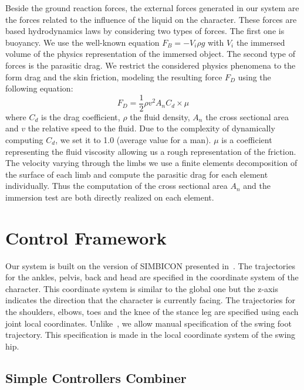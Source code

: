 \documentclass[conference]{acmsiggraph}
\begin{document}
Beside the ground reaction forces, the external forces generated in our system are the forces related to the influence of the liquid on the character. These forces are based hydrodynamics laws by considering two types of forces. The first one is buoyancy. We use the well-known equation $F_{B}=-V_i \rho g$ with $V_i$ the immersed volume of the physics representation of the immersed object. The second type of forces is the parasitic drag. We restrict the considered physics phenomena to the form drag and the skin friction, modeling the resulting force $F_D$ using the following equation:
$$
F_D=\frac{1}{2} \rho v^2 A_n C_d \times \mu
$$
where $C_d$ is the drag coefficient, $\rho$ the fluid density, $A_n$ the cross sectional area and $v$ the relative speed to the fluid. Due to the complexity of dynamically computing $C_d$, we set it to 1.0 (average value for a man). $\mu$ is a coefficient representing the fluid viscosity allowing us a rough representation of the friction. The velocity varying through the limbs we use a finite elements decomposition of the surface of each limb and compute the parasitic drag for each element individually. Thus the computation of the cross sectional area $A_n$ and the immersion test are both directly realized on each element.

\section{Control Framework}
\label{sec:control_framework}

Our system is built on the version of SIMBICON presented in~\cite{coros2010generalized}. The trajectories for the ankles, pelvis, back and head are specified in the coordinate system of the character. This coordinate system is similar to the global one but the z-axis indicates the direction that the character is currently facing. The trajectories for the shoulders, elbows, toes and the knee of the stance leg are specified using each joint local coordinates. Unlike~\cite{coros2010generalized}, we allow manual specification of the swing foot trajectory. This specification is made in the local coordinate system of the swing hip.

\subsection{Simple Controllers Combiner}
\label{sec:multi_state}
\end{document}
